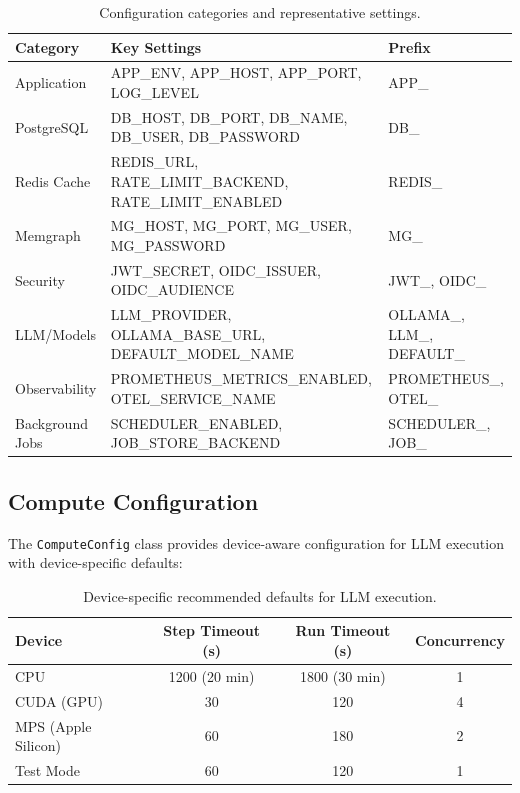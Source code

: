 \documentclass[a4paper,twoside]{sapthesis}
\begin{document}
\begin{table}[ht]
\centering
\caption{Configuration categories and representative settings.}
\label{tab:config-categories}
\small
\begin{tabularx}{\textwidth}{p{2.2cm}>{\raggedright\arraybackslash}Xp{3.2cm}}
\toprule
\textbf{Category} & \textbf{Key Settings} & \textbf{Prefix} \\
\midrule
Application & APP\_ENV, APP\_HOST, APP\_PORT, LOG\_LEVEL & APP\_ \\
PostgreSQL & DB\_HOST, DB\_PORT, DB\_NAME, DB\_USER, DB\_PASSWORD & DB\_ \\
Redis Cache & REDIS\_URL, RATE\_LIMIT\_BACKEND, RATE\_LIMIT\_ENABLED & REDIS\_ \\
Memgraph & MG\_HOST, MG\_PORT, MG\_USER, MG\_PASSWORD & MG\_ \\
Security & JWT\_SECRET, OIDC\_ISSUER, OIDC\_AUDIENCE & JWT\_, OIDC\_ \\
LLM/Models & LLM\_PROVIDER, OLLAMA\_BASE\_URL, DEFAULT\_MODEL\_NAME & OLLAMA\_, LLM\_, DEFAULT\_ \\
Observability & PROMETHEUS\_METRICS\_ENABLED, OTEL\_SERVICE\_NAME & PROMETHEUS\_, OTEL\_ \\
Background Jobs & SCHEDULER\_ENABLED, JOB\_STORE\_BACKEND & SCHEDULER\_, JOB\_ \\
\bottomrule
\end{tabularx}
\end{table}

\subsection{Compute Configuration}
\label{subsec:compute-config}

The \texttt{ComputeConfig} class provides device-aware configuration for LLM execution with device-specific defaults:

\begin{table}[ht]
\centering
\caption{Device-specific recommended defaults for LLM execution.}
\label{tab:device-defaults}
\begin{tabular}{lccc}
\hline
\textbf{Device} & \textbf{Step Timeout (s)} & \textbf{Run Timeout (s)} & \textbf{Concurrency} \\
\midrule
CPU & 1200 (20 min) & 1800 (30 min) & 1 \\
CUDA (GPU) & 30 & 120 & 4 \\
MPS (Apple Silicon) & 60 & 180 & 2 \\
Test Mode & 60 & 120 & 1 \\
\midrule
\end{tabular}
\end{table}
\end{document}
